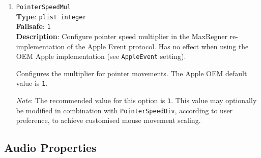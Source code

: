 \documentclass[]{article}
\begin{document}
\begin{enumerate}
  Configures the divisor for pointer movements. The Apple OEM default value is \texttt{1}.
  \texttt{0} is an invalid value for this option.

  \emph{Note}: The recommended value for this option is \texttt{1}. This value may
  optionally be modified in combination with \texttt{PointerSpeedMul}, according to user
  preference, to achieve customised mouse movement scaling.

\item
  \texttt{PointerSpeedMul}\\
  \textbf{Type}: \texttt{plist\ integer}\\
  \textbf{Failsafe}: \texttt{1}\\
  \textbf{Description}: Configure pointer speed multiplier in the MaxRegner re-implementation
  of the Apple Event protocol.
  Has no effect when using the OEM Apple implementation (see \texttt{AppleEvent} setting).

  Configures the multiplier for pointer movements. The Apple OEM default value is \texttt{1}.

  \emph{Note}: The recommended value for this option is \texttt{1}. This value may
  optionally be modified in combination with \texttt{PointerSpeedDiv}, according to user
  preference, to achieve customised mouse movement scaling.

\end{enumerate}

\subsection{Audio Properties}\label{uefiaudioprops}
\end{document}
